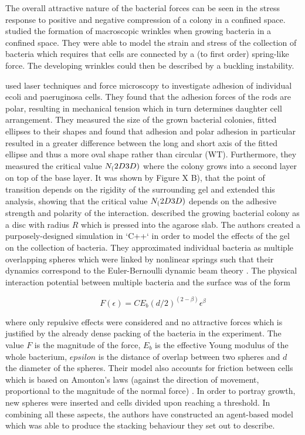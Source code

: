 \documentclass{article}
\begin{document}
The overall attractive nature of the bacterial forces can be seen in the stress response to positive
and negative compression of a colony in a confined space.
\cite{Trejo2013} studied the formation of macroscopic wrinkles when growing bacteria in a confined
space.
They were able to model the strain and stress of the collection of bacteria which requires that
cells are connected by a (to first order) spring-like force.
The developing wrinkles could then be described by a buckling instability.

\cite{Duvernoy2018} used laser techniques and force microscopy to investigate adhesion of individual
\ac{ecoli} and \ac{paeruginosa} cells.
They found that the adhesion forces of the rods are polar, resulting in mechanical tension which in
turn determines daughter cell arrangement.
They measured the size of the grown bacterial colonies, fitted ellipses to their shapes and found
that adhesion and polar adhesion in particular resulted in a greater difference between the long and
short axis of the fitted ellipse and thus a more oval shape rather than circular (WT).
Furthermore, they measured the critical value $N_(2D\/3D)$ where the colony grows into a second
layer on top of the base layer.
It was shown by \cite{Grant2014} Figure X B), that the point of transition
depends on the rigidity of the surrounding gel and \cite{Duvernoy2018} extended this analysis,
showing that the critical value $N_(2D\/3D)$ depends on the adhesive strength and polarity of the
interaction.
\cite{Grant2014} described the growing bacterial colony as a disc with radius $R$ which is pressed
into the agarose slab.
The authors created a purposely-designed simulation in `C++` in order to model the effects of the
gel on the collection of bacteria.
They approximated individual bacteria as multiple overlapping spheres which were linked by nonlinear
springs such that their dynamics correspond to the Euler-Bernoulli dynamic beam theory
\cite{HAN1999}.
The physical interaction potential between multiple bacteria and the surface was of the form

\begin{equation}
    F(\epsilon) = C E_b (d/2)^(2 - \beta) \epsilon^\beta
\end{equation}

where only repulsive effects were considered and no attractive forces which is justified by the
already dense packing of the bacteria in the experiment.
The value $F$ is the magnitude of the force, $E_b$ is the effective Young modulus of the whole
bacterium, $epsilon$ is the distance of overlap between two spheres and $d$ the diameter of the
spheres.
Their model also accounts for friction between cells which is based on Amonton's laws (against the
direction of movement, proportional to the magnitude of the normal force) \cite{Hutchings2021}.
In order to portray growth, new spheres were inserted and cells divided upon reaching a threshold.
In combining all these aspects, the authors have constructed an agent-based model which was able to
produce the stacking behaviour they set out to describe.
\end{document}

